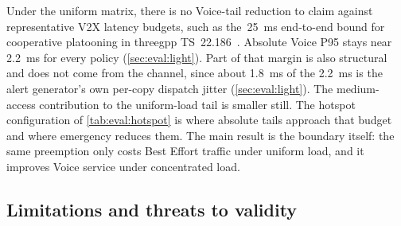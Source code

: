\label{sec:eval:disc:significance}
Under the uniform matrix, there is no Voice-tail reduction to claim against representative V2X latency budgets, such as the~\SI{25}{\milli\second} end-to-end bound for cooperative platooning in \gls{threegpp} TS~22.186~\cite{ts22186}.
Absolute Voice P95 stays near 2.2~ms for every policy (\autoref{sec:eval:light}).
Part of that margin is also structural and does not come from the channel, since about \SI{1.8}{\milli\second} of the 2.2~ms is the alert generator's own per-copy dispatch jitter (\autoref{sec:eval:light}).
The medium-access contribution to the uniform-load tail is smaller still.
The hotspot configuration of \autoref{tab:eval:hotspot} is where absolute tails approach that budget and where emergency reduces them.
The main result is the boundary itself: the same preemption only costs Best Effort traffic under uniform load, and it improves Voice service under concentrated load.

\subsection{Limitations and threats to validity}
\label{sec:eval:disc:limits}

